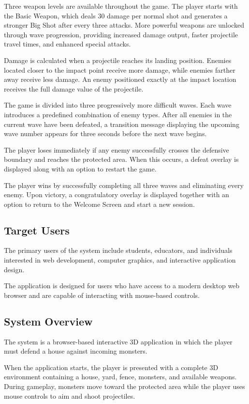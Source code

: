 \documentclass[11pt,a4paper]{article}
\begin{document}
Three weapon levels are available throughout the game. The player starts with
the Basic Weapon, which deals 30 damage per normal shot and generates a stronger
Big Shot after every three attacks. More powerful weapons are unlocked through
wave progression, providing increased damage output, faster projectile travel
times, and enhanced special attacks.

Damage is calculated when a projectile reaches its landing position. Enemies
located closer to the impact point receive more damage, while enemies farther
away receive less damage. An enemy positioned exactly at the impact location
receives the full damage value of the projectile.

The game is divided into three progressively more difficult waves. Each wave
introduces a predefined combination of enemy types. After all enemies in the
current wave have been defeated, a transition message displaying the upcoming
wave number appears for three seconds before the next wave begins.

The player loses immediately if any enemy successfully crosses the defensive
boundary and reaches the protected area. When this occurs, a defeat overlay is
displayed along with an option to restart the game.

The player wins by successfully completing all three waves and eliminating every
enemy. Upon victory, a congratulatory overlay is displayed together with an
option to return to the Welcome Screen and start a new session.

\subsection{Target Users}

The primary users of the system include students, educators, and individuals
interested in web development, computer graphics, and interactive application
design.

The application is designed for users who have access to a modern desktop web
browser and are capable of interacting with mouse-based controls.

\subsection{System Overview}

The system is a browser-based interactive 3D application in which the player
must defend a house against incoming monsters.

When the application starts, the player is presented with a complete 3D
environment containing a house, yard, fence, monsters, and available weapons.
During gameplay, monsters move toward the protected area while the player uses
mouse controls to aim and shoot projectiles.
\end{document}
